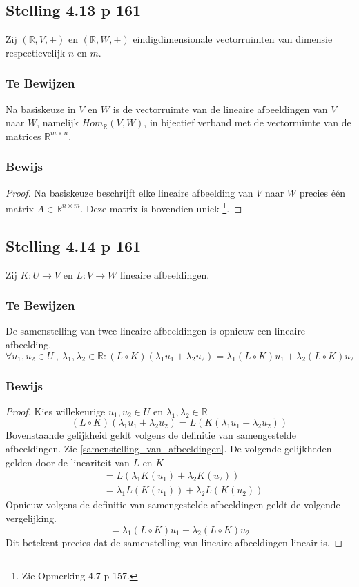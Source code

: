 \documentclass[lineaire_algebra_oplossingen.tex]{subfiles}
\begin{document}
\subsection{Stelling 4.13 p 161}
\label{4.13}
Zij $(\mathbb{R},V,+)$ en  $(\mathbb{R},W,+)$ eindigdimensionale vectorruimten van dimensie respectievelijk $n$ en $m$.
\subsubsection*{Te Bewijzen}
Na basiskeuze in $V$ en $W$ is de vectorruimte van de lineaire afbeeldingen van $V$ naar $W$, namelijk $\textit{Hom}_{\mathbb{R}}(V,W)$, in bijectief verband met de vectorruimte van de matrices $\mathbb{R}^{m\times n}$.
\subsubsection*{Bewijs}
\begin{proof}
Na basiskeuze beschrijft elke lineaire afbeelding van $V$ naar $W$ precies \'e\'en matrix $A\in \mathbb{R}^{n\times m}$. Deze matrix is bovendien uniek \footnote{Zie Opmerking 4.7 p 157.}.
\end{proof}

\subsection{Stelling 4.14 p 161}
\label{4.14}
Zij $K:U\rightarrow V$ en $L:V\rightarrow W$ lineaire afbeeldingen.
\subsubsection*{Te Bewijzen}
De samenstelling van twee lineaire afbeeldingen is opnieuw een lineaire afbeelding.
\[
\forall u_1,u_2\in U \ ,\ \lambda_1,\lambda_2\in\mathbb{R}: (L\circ K)(\lambda_1u_1 + \lambda_2u_2) = \lambda_1(L\circ K)u_1 + \lambda_2(L\circ K)u_2
\]
\subsubsection*{Bewijs}
\begin{proof}
Kies willekeurige $u_1,u_2\in U$ en $\lambda_1,\lambda_2\in\mathbb{R}$
\[
(L\circ K)(\lambda_1u_1 + \lambda_2u_2) = L(K(\lambda_1u_1 + \lambda_2u_2))
\]
Bovenstaande gelijkheid geldt volgens de definitie van samengestelde afbeeldingen. Zie \ref{samenstelling_van_afbeeldingen}. De volgende gelijkheden gelden door de lineariteit van $L$ en $K$
\begin{align*}
&= L(\lambda_1K(u_1) + \lambda_2K(u_2)) \\
&= \lambda_1L(K(u_1)) + \lambda_2L(K(u_2))
\end{align*}
Opnieuw volgens de definitie van samengestelde afbeeldingen geldt de volgende vergelijking.
\[
= \lambda_1(L\circ K)u_1 + \lambda_2(L\circ K)u_2
\]
Dit betekent precies dat de samenstelling van lineaire afbeeldingen lineair is.
\end{proof}
\end{document}
